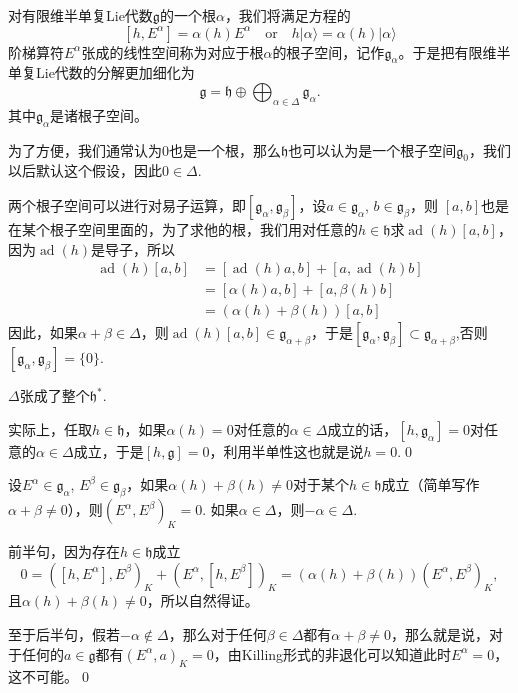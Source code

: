 \documentclass[9pt]{extarticle}
\newcommand{\lag}{{\mathfrak{g}}}
\DeclareMathOperator{\ad}{ad}
\begin{document}
\para 对有限维半单复Lie代数$\lag$的一个根$\alpha$，我们将满足方程的
\[
	[h,E^\alpha]=\alpha(h)E^\alpha\quad\text{or}\quad h|\alpha\rangle=\alpha(h)|\alpha\rangle
\]
阶梯算符$E^\alpha$张成的线性空间称为对应于根$\alpha$的根子空间，记作$\lag_{\alpha}$。于是把有限维半单复Lie代数的分解更加细化为
\[
	\lag=\mathfrak{h}\oplus \bigoplus_{\alpha\in\Delta} \lag_\alpha.
\]
其中$\lag_\alpha$是诸根子空间。

为了方便，我们通常认为$0$也是一个根，那么$\mathfrak{h}$也可以认为是一个根子空间$\lag_0$，我们以后默认这个假设，因此$0\in\Delta$.

\para 两个根子空间可以进行对易子运算，即$[\lag_\alpha,\lag_\beta]$，设$a\in\lag_\alpha$, $b\in\lag_\beta$，则
$[a,b]$也是在某个根子空间里面的，为了求他的根，我们用对任意的$h\in \mathfrak{h}$求$\ad(h)[a,b]$，因为$\ad(h)$是导子，所以
\[
	\begin{split}
		\ad(h)[a,b]&=[\ad(h)a,b]+[a,\ad(h)b]\\
		&=[\alpha(h)a,b]+[a,\beta(h)b]\\
		&=(\alpha(h)+\beta(h))[a,b]
	\end{split}
\]
因此，如果$\alpha+\beta\in\Delta$，则$\ad(h)[a,b]\in \lag_{\alpha+\beta}$，于是$[\lag_\alpha,\lag_\beta]\subset \lag_{\alpha+\beta}$,否则$[\lag_\alpha,\lag_\beta]=\{0\}$.

\pro $\Delta$张成了整个$\mathfrak{h}^*$.

\proof 实际上，任取$h\in \mathfrak{h}$，如果$\alpha(h)=0$对任意的$\alpha\in \Delta$成立的话，$[h,\lag_{\alpha}]=0$对任意的$\alpha\in \Delta$成立，于是$[h,\lag]=0$，利用半单性这也就是说$h=0$.\qed

\pro 设$E^\alpha\in\lag_\alpha$, $E^\beta\in\lag_\beta$，如果$\alpha(h)+\beta(h)\neq 0$对于某个$h\in \mathfrak{h}$成立（简单写作$\alpha+\beta\neq 0$），则$(E^\alpha,E^\beta)_K=0$. 如果$\alpha\in\Delta$，则$-\alpha\in\Delta$.

\proof 前半句，因为存在$h\in\mathfrak{h}$成立
\[
	0=([h,E^\alpha],E^\beta)_K+(E^\alpha,[h,E^\beta])_K=(\alpha(h)+\beta(h))(E^\alpha,E^\beta)_K,
\]
且$\alpha(h)+\beta(h)\neq 0$，所以自然得证。

至于后半句，假若$-\alpha\notin\Delta$，那么对于任何$\beta\in\Delta$都有$\alpha+\beta\neq 0$，那么就是说，对于任何的$a\in \lag$都有$(E^\alpha,a)_K=0$，由Killing形式的非退化可以知道此时$E^\alpha=0$，这不可能。\qed

\end{document}
